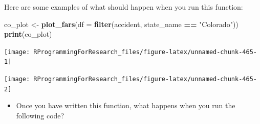 \documentclass[]{book}
\makeatletter
\newenvironment{Shaded}{\begin{snugshade}}{\end{snugshade}}
\newcommand{\KeywordTok}[1]{\textcolor[rgb]{0.13,0.29,0.53}{\textbf{#1}}}
\newcommand{\DataTypeTok}[1]{\textcolor[rgb]{0.13,0.29,0.53}{#1}}
\newcommand{\DecValTok}[1]{\textcolor[rgb]{0.00,0.00,0.81}{#1}}
\newcommand{\StringTok}[1]{\textcolor[rgb]{0.31,0.60,0.02}{#1}}
\newcommand{\OperatorTok}[1]{\textcolor[rgb]{0.81,0.36,0.00}{\textbf{#1}}}
\newcommand{\NormalTok}[1]{#1}
\providecommand{\tightlist}{%
  \setlength{\itemsep}{0pt}\setlength{\parskip}{0pt}}
\newenvironment{kframe}{%
\medskip{}
\setlength{\fboxsep}{.8em}
 \def\at@end@of@kframe{}%
 \ifinner\ifhmode%
  \def\at@end@of@kframe{\end{minipage}}%
  \begin{minipage}{\columnwidth}%
 \fi\fi%
 \def\FrameCommand##1{\hskip\@totalleftmargin \hskip-\fboxsep
 \colorbox{shadecolor}{##1}\hskip-\fboxsep
     \hskip-\linewidth \hskip-\@totalleftmargin \hskip\columnwidth}%
 \MakeFramed {\advance\hsize-\width
   \@totalleftmargin\z@ \linewidth\hsize
   \@setminipage}}%
 {\par\unskip\endMakeFramed%
 \at@end@of@kframe}
\renewenvironment{Shaded}{\begin{kframe}}{\end{kframe}}
\theoremstyle{definition}
\theoremstyle{definition}
\theoremstyle{definition}
\theoremstyle{remark}
\makeatother
\begin{document}
Here are some examples of what should happen when you run this function:

\begin{Shaded}
\begin{Highlighting}[]
\NormalTok{co_plot <-}\StringTok{ }\KeywordTok{plot_fars}\NormalTok{(}\DataTypeTok{df =} \KeywordTok{filter}\NormalTok{(accident, state_name }\OperatorTok{==}\StringTok{ "Colorado"}\NormalTok{))}
\KeywordTok{print}\NormalTok{(co_plot)}
\end{Highlighting}
\end{Shaded}

\begin{center}\texttt{[image: RProgrammingForResearch\_files/figure-latex/unnamed-chunk-465-1]} \end{center}

\begin{Shaded}
\end{Shaded}

\begin{center}\texttt{[image: RProgrammingForResearch\_files/figure-latex/unnamed-chunk-465-2]} \end{center}

\begin{itemize}
\tightlist
\item
  Once you have written this function, what happens when you run the
  following code?
\end{itemize}

\begin{Shaded}
\end{Shaded}
\end{document}
